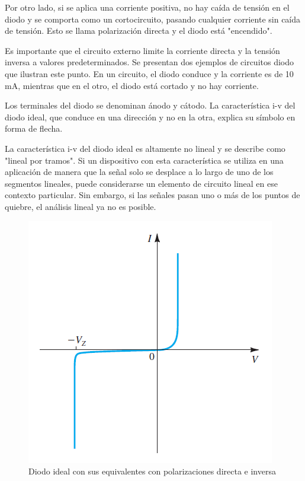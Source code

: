 Por otro lado, si se aplica una corriente positiva, no hay caída de tensión en el diodo y se comporta como un cortocircuito, pasando cualquier corriente sin caída de tensión. Esto se llama polarización directa y el diodo está "encendido".

Es importante que el circuito externo limite la corriente directa y la tensión inversa a valores predeterminados. Se presentan dos ejemplos de circuitos diodo que ilustran este punto. En un circuito, el diodo conduce y la corriente es de 10 mA, mientras que en el otro, el diodo está cortado y no hay corriente.

Los terminales del diodo se denominan ánodo y cátodo. La característica i-v del diodo ideal, que conduce en una dirección y no en la otra, explica su símbolo en forma de flecha.

La característica i-v del diodo ideal es altamente no lineal y se describe como "lineal por tramos". Si un dispositivo con esta característica se utiliza en una aplicación de manera que la señal solo se desplace a lo largo de uno de los segmentos lineales, puede considerarse un elemento de circuito lineal en ese contexto particular. Sin embargo, si las señales pasan uno o más de los puntos de quiebre, el análisis lineal ya no es posible.

\begin{figure}[H]
    \centering
    \includegraphics[scale=0.6]{Electronica/Diodo_F1.png}
    \caption{Diodo ideal con sus equivalentes con polarizaciones directa e inversa}
    \label{fig_diodoIdeal}
\end{figure}

